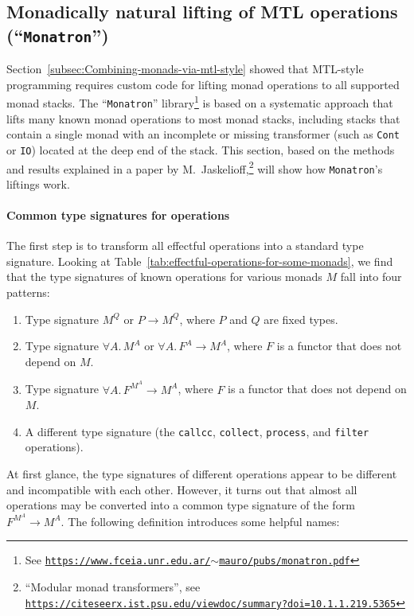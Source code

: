 \subsection{Monadically natural lifting of MTL operations (\textquotedblleft\texttt{Monatron}\textquotedblright )\label{subsec:Monatron}}

Section~\ref{subsec:Combining-monads-via-mtl-style} showed that
MTL-style programming requires custom code for lifting monad operations
to all supported monad stacks. The \textsf{``}\texttt{Monatron}\textsf{''} library\footnote{See \texttt{\href{https://www.fceia.unr.edu.ar/~mauro/pubs/monatron.pdf}{https://www.fceia.unr.edu.ar/$\sim$mauro/pubs/monatron.pdf}}}
is based on a systematic approach that lifts many known monad operations
to most monad stacks, including stacks that contain a single monad
with an incomplete or missing transformer (such as \lstinline!Cont!
or \lstinline!IO!) located at the deep end of the stack. This section,
based on the methods and results explained in a paper by M.~Jaskelioff,\footnote{\textsf{``}Modular monad transformers\textsf{''}, see \texttt{\href{https://citeseerx.ist.psu.edu/viewdoc/summary?doi=10.1.1.219.5365}{https://citeseerx.ist.psu.edu/viewdoc/summary?doi=10.1.1.219.5365}}}
will show how \texttt{Monatron}\textsf{'}s liftings work. 

\paragraph{Common type signatures for operations}

The first step is to transform all effectful operations into a standard
type signature. Looking at Table~\ref{tab:effectful-operations-for-some-monads},
we find that the type signatures of known operations for various monads
$M$ fall into four patterns: 
\begin{enumerate}
\item Type signature $M^{Q}$ or $P\rightarrow M^{Q}$, where $P$ and $Q$
are fixed types.
\item Type signature $\forall A.\,M^{A}$ or $\forall A.\,F^{A}\rightarrow M^{A}$,
where $F$ is a functor that does not depend on $M$.
\item Type signature $\forall A.\,F^{M^{A}}\rightarrow M^{A}$, where $F$
is a functor that does not depend on $M$.
\item A different type signature (the \lstinline!callcc!, \lstinline!collect!,
\lstinline!process!, and \lstinline!filter! operations).
\end{enumerate}
At first glance, the type signatures of different operations appear
to be different and incompatible with each other. However, it turns
out that almost all operations may be converted into a common type
signature of the form $F^{M^{A}}\rightarrow M^{A}$. The following
definition introduces some helpful names:

